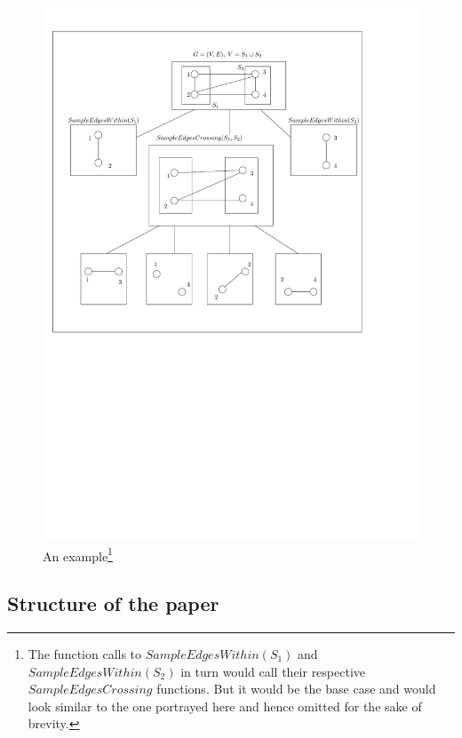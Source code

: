 \begin{figure}[h!]
\begin{minipage}{\textwidth}
\begin{center}
    \includegraphics[scale=0.85]{Figures/alg-tree}
    \caption[Example]{An example\footnote{The function calls to $SampleEdgesWithin(S_1)$ and $SampleEdgesWithin(S_2)$ in turn would call their respective $SampleEdgesCrossing$ functions. But it would be the base case and would look similar to the one portrayed here and hence omitted for the sake of brevity.}}
\end{center}
\end{minipage}

\end{figure}
\pagebreak

\subsection{Structure of the paper}

